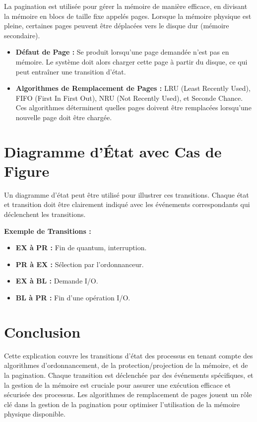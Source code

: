 La pagination est utilisée pour gérer la mémoire de manière efficace, en divisant la mémoire en blocs de taille fixe appelés pages. Lorsque la mémoire physique est pleine, certaines pages peuvent être déplacées vers le disque dur (mémoire secondaire).

\begin{itemize}
    \item \textbf{Défaut de Page :} Se produit lorsqu'une page demandée n'est pas en mémoire. Le système doit alors charger cette page à partir du disque, ce qui peut entraîner une transition d'état.
    \item \textbf{Algorithmes de Remplacement de Pages :} LRU (Least Recently Used), FIFO (First In First Out), NRU (Not Recently Used), et Seconde Chance. Ces algorithmes déterminent quelles pages doivent être remplacées lorsqu'une nouvelle page doit être chargée.
\end{itemize}

\section*{Diagramme d'État avec Cas de Figure}

Un diagramme d'état peut être utilisé pour illustrer ces transitions. Chaque état et transition doit être clairement indiqué avec les événements correspondants qui déclenchent les transitions.

\textbf{Exemple de Transitions :}

\begin{itemize}
    \item \textbf{EX à PR :} Fin de quantum, interruption.
    \item \textbf{PR à EX :} Sélection par l'ordonnanceur.
    \item \textbf{EX à BL :} Demande I/O.
    \item \textbf{BL à PR :} Fin d'une opération I/O.
\end{itemize}

\section*{Conclusion}

Cette explication couvre les transitions d'état des processus en tenant compte des algorithmes d'ordonnancement, de la protection/projection de la mémoire, et de la pagination. Chaque transition est déclenchée par des événements spécifiques, et la gestion de la mémoire est cruciale pour assurer une exécution efficace et sécurisée des processus. Les algorithmes de remplacement de pages jouent un rôle clé dans la gestion de la pagination pour optimiser l'utilisation de la mémoire physique disponible.
